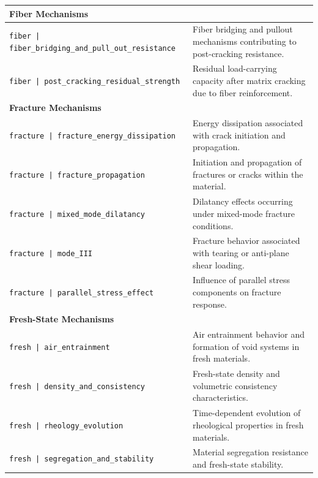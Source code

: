 \documentclass[11pt]{book}
\begin{document}
{\begin{longtable}{p{}p{}}
\hline
\multicolumn{2}{l}{\textbf{Fiber Mechanisms}}\\
\hline

\texttt{fiber | fiber\_bridging\_and\_pull\_out\_resistance} &
Fiber bridging and pullout mechanisms contributing to post-cracking resistance. \\

\texttt{fiber | post\_cracking\_residual\_strength} &
Residual load-carrying capacity after matrix cracking due to fiber reinforcement. \\

\hline
\multicolumn{2}{l}{\textbf{Fracture Mechanisms}}\\
\hline

\texttt{fracture | fracture\_energy\_dissipation} &
Energy dissipation associated with crack initiation and propagation. \\

\texttt{fracture | fracture\_propagation} &
Initiation and propagation of fractures or cracks within the material. \\

\texttt{fracture | mixed\_mode\_dilatancy} &
Dilatancy effects occurring under mixed-mode fracture conditions. \\

\texttt{fracture | mode\_III} &
Fracture behavior associated with tearing or anti-plane shear loading. \\

\texttt{fracture | parallel\_stress\_effect} &
Influence of parallel stress components on fracture response. \\

\hline
\multicolumn{2}{l}{\textbf{Fresh-State Mechanisms}}\\
\hline

\texttt{fresh | air\_entrainment} &
Air entrainment behavior and formation of void systems in fresh materials. \\

\texttt{fresh | density\_and\_consistency} &
Fresh-state density and volumetric consistency characteristics. \\

\texttt{fresh | rheology\_evolution} &
Time-dependent evolution of rheological properties in fresh materials. \\

\texttt{fresh | segregation\_and\_stability} &
Material segregation resistance and fresh-state stability. \\


\end{longtable}}
\end{document}
